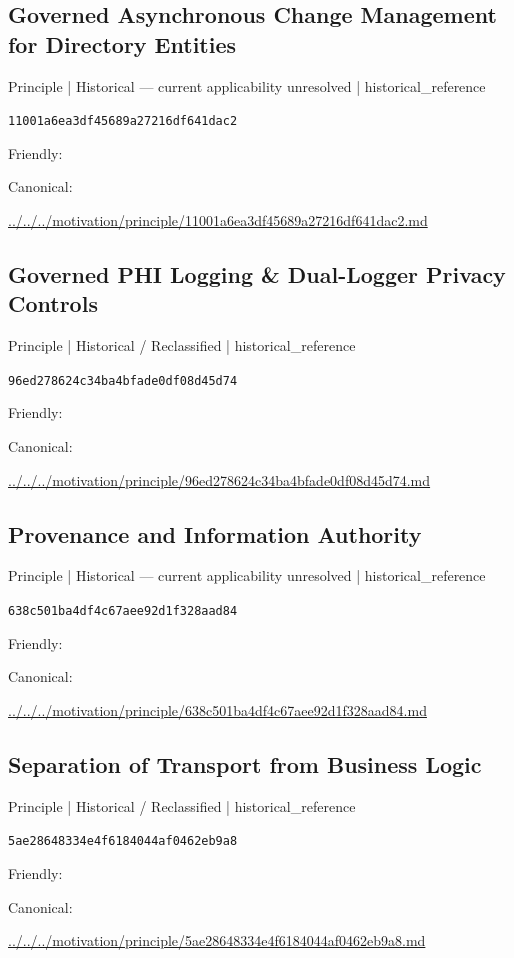 \documentclass[10pt,a4paper]{article}
\begin{document}
\subsection*{Governed Asynchronous Change Management for Directory Entities}
{\small Principle | Historical — current applicability unresolved | historical\_reference}\par
\texttt{11001a6ea3df45689a27216df641dac2}\par
Friendly: \par
Canonical: \par
{\footnotesize\url{../../../motivation/principle/11001a6ea3df45689a27216df641dac2.md}}\par
\subsection*{Governed PHI Logging \& Dual-Logger Privacy Controls}
{\small Principle | Historical / Reclassified | historical\_reference}\par
\texttt{96ed278624c34ba4bfade0df08d45d74}\par
Friendly: \par
Canonical: \par
{\footnotesize\url{../../../motivation/principle/96ed278624c34ba4bfade0df08d45d74.md}}\par
\subsection*{Provenance and Information Authority}
{\small Principle | Historical — current applicability unresolved | historical\_reference}\par
\texttt{638c501ba4df4c67aee92d1f328aad84}\par
Friendly: \par
Canonical: \par
{\footnotesize\url{../../../motivation/principle/638c501ba4df4c67aee92d1f328aad84.md}}\par
\subsection*{Separation of Transport from Business Logic}
{\small Principle | Historical / Reclassified | historical\_reference}\par
\texttt{5ae28648334e4f6184044af0462eb9a8}\par
Friendly: \par
Canonical: \par
{\footnotesize\url{../../../motivation/principle/5ae28648334e4f6184044af0462eb9a8.md}}\par
\end{document}
